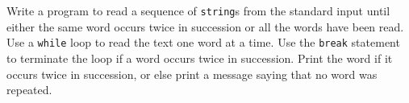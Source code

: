 %
%
\begin{question}
Write a program to read a sequence of \verb|string|s from the
standard input until either the same word occurs twice in succession or all
the words have been read. Use a \verb|while| loop to read the text one word at a
time. Use the \verb|break| statement to terminate the loop if a word occurs twice
in succession. Print the word if it occurs twice in succession, or else print a
message saying that no word was repeated.
\end{question}
